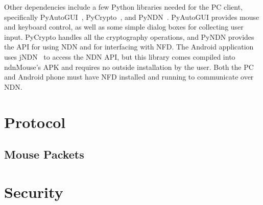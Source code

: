 \documentclass{sig-alternate}
\renewcommand\_{\textunderscore\allowbreak}  %
\begin{document}
Other dependencies include a few Python libraries needed for the PC client, specifically PyAutoGUI~\cite{pyautogui}, PyCrypto~\cite{pycrypto}, and PyNDN~\cite{pyndn}. PyAutoGUI provides mouse and keyboard control, as well as some simple dialog boxes for collecting user input. PyCrypto handles all the cryptography operations, and PyNDN provides the API for using NDN and for interfacing with NFD. The Android application uses jNDN~\cite{jndn} to access the NDN API, but this library comes compiled into ndnMouse's APK and requires no outside installation by the user. Both the PC and Android phone must have NFD installed and running to communicate over NDN.

\section{Protocol}

\subsection{Mouse Packets}

\section{Security}
\end{document}
